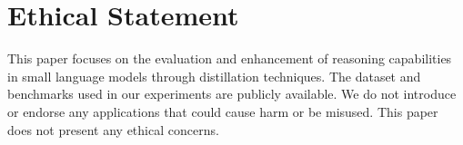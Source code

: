 \section*{Ethical Statement}
This paper focuses on the evaluation and enhancement of reasoning capabilities in small language models through distillation techniques. The dataset and benchmarks used in our experiments are publicly available. We do not introduce or endorse any applications that could cause harm or be misused.
This paper does not present any ethical concerns. 
